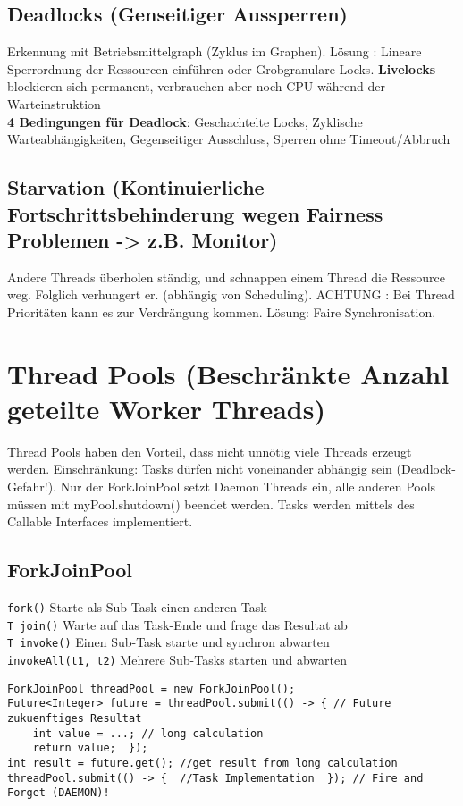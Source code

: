 \subsection{Deadlocks (Genseitiger Aussperren)}
Erkennung mit Betriebsmittelgraph (Zyklus im Graphen). Lösung : Lineare Sperrordnung der Ressourcen einführen oder Grobgranulare Locks. \textbf{Livelocks} blockieren sich permanent, verbrauchen aber noch CPU während der Warteinstruktion \\
\textbf{4 Bedingungen für Deadlock}: Geschachtelte Locks, Zyklische Warteabhängigkeiten, Gegenseitiger Ausschluss, Sperren ohne Timeout/Abbruch

\subsection{Starvation (Kontinuierliche Fortschrittsbehinderung wegen Fairness Problemen -> z.B. Monitor)}
Andere Threads überholen ständig, und schnappen einem Thread die Ressource weg. Folglich verhungert er. (abhängig von Scheduling). ACHTUNG : Bei Thread Prioritäten kann es zur Verdrängung kommen. Lösung: Faire Synchronisation.

\section{Thread Pools (Beschränkte Anzahl geteilte Worker Threads)}
Thread Pools haben den Vorteil, dass nicht unnötig viele Threads erzeugt werden. Einschränkung: Tasks dürfen nicht voneinander abhängig sein (Deadlock-Gefahr!). Nur der ForkJoinPool setzt Daemon Threads ein, alle anderen Pools müssen mit myPool.shutdown() beendet werden. Tasks werden mittels des Callable Interfaces implementiert.

\subsection{ForkJoinPool}
\lstinline|fork()| Starte als Sub-Task einen anderen Task \\
\lstinline|T join()| Warte auf das Task-Ende und frage das Resultat ab \\
\lstinline|T invoke()| Einen Sub-Task starte und synchron abwarten  \\
\lstinline|invokeAll(t1, t2)| Mehrere Sub-Tasks starten und abwarten

\begin{lstlisting}[style=java]
ForkJoinPool threadPool = new ForkJoinPool();
Future<Integer> future = threadPool.submit(() -> { // Future zukuenftiges Resultat
    int value = ...; // long calculation
    return value;  });
int result = future.get(); //get result from long calculation
threadPool.submit(() -> {  //Task Implementation  }); // Fire and Forget (DAEMON)!
\end{lstlisting}

